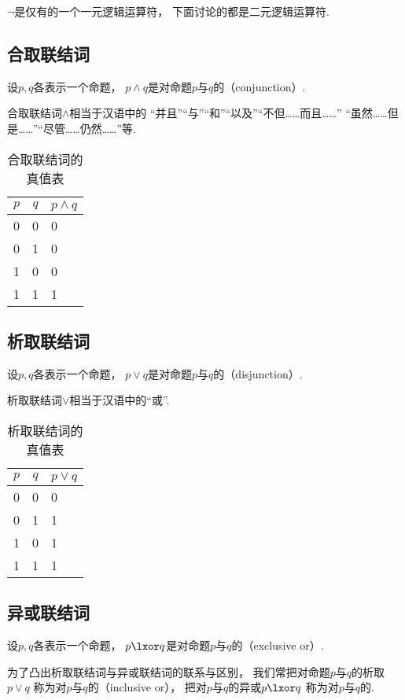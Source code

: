 \(\neg\)是仅有的一个一元逻辑运算符，
下面讨论的都是二元逻辑运算符.

\subsection{合取联结词}
设\(p,q\)各表示一个命题，
\(p \land q\)是对命题\(p\)与\(q\)的（conjunction）.

合取联结词\(\land\)相当于汉语中的
“并且”“与”“和”“以及”“不但……而且……”
“虽然……但是……”“尽管……仍然……”等.

\begin{table}[ht]
	\centering
	\begin{tabular}{|*{2}{c|}p{2cm}|}
		\hline
		\(p\) & \(q\) & \(p \land q\) \\
		\hline
		0 & 0 & 0 \\
		0 & 1 & 0 \\
		1 & 0 & 0 \\
		1 & 1 & 1 \\
		\hline
	\end{tabular}
	\caption{合取联结词的真值表}
\end{table}

\subsection{析取联结词}
设\(p,q\)各表示一个命题，
\(p \lor q\)是对命题\(p\)与\(q\)的（disjunction）.

析取联结词\(\lor\)相当于汉语中的“或”.

\begin{table}[ht]
	\centering
	\begin{tabular}{|*{2}{c|}p{2cm}|}
		\hline
		\(p\) & \(q\) & \(p \lor q\) \\
		\hline
		0 & 0 & 0 \\
		0 & 1 & 1 \\
		1 & 0 & 1 \\
		1 & 1 & 1 \\
		\hline
	\end{tabular}
	\caption{析取联结词的真值表}
\end{table}

\subsection{异或联结词}
设\(p,q\)各表示一个命题，
\(p \lxor q\)是对命题\(p\)与\(q\)的（exclusive or）.

为了凸出析取联结词与异或联结词的联系与区别，
我们常把对命题\(p\)与\(q\)的析取\(p \lor q\)
称为对\(p\)与\(q\)的（inclusive or），
把对\(p\)与\(q\)的异或\(p \lxor q\)
称为对\(p\)与\(q\)的.

